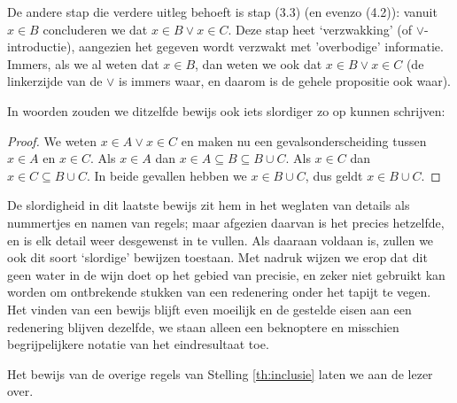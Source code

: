 De andere stap die verdere uitleg behoeft is stap (3.3) (en evenzo (4.2)): vanuit $x\in B$ concluderen we dat $x\in B\lor x\in C$. Deze stap heet `verzwakking' (of $\lor$-introductie), aangezien het gegeven wordt verzwakt met 'overbodige' informatie. Immers, als we al weten dat $x\in B$, dan weten we ook dat $x\in B\lor x\in C$ (de linkerzijde van de $\lor$ is immers waar, en daarom is de gehele propositie ook waar). %

In woorden zouden we ditzelfde bewijs ook iets slordiger zo op kunnen schrijven:
\begin{proof}
We weten $x\in A\lor x\in C$ en maken nu een gevalsonderscheiding tussen $x\in A$ en $x\in C$. Als $x\in A$ dan $x\in A\subseteq B\subseteq B\cup C$. Als $x\in C$ dan $x\in C\subseteq B\cup C$. In beide gevallen hebben we $x\in B\cup C$, dus geldt $x\in B\cup C$.
\end{proof}
De slordigheid in dit laatste bewijs zit hem in het weglaten van details als nummertjes en namen van regels; maar afgezien daarvan is het precies hetzelfde, en is elk detail weer desgewenst in te vullen. Als daaraan voldaan is, zullen we ook dit soort `slordige' bewijzen toestaan. Met nadruk wijzen we erop dat dit geen water in de wijn doet op het gebied van precisie, en zeker niet gebruikt kan worden om ontbrekende stukken van een redenering onder het tapijt te vegen. Het vinden van een bewijs blijft even moeilijk en de gestelde eisen aan een redenering blijven dezelfde, we staan alleen een beknoptere en misschien begrijpelijkere notatie van het eindresultaat toe.

Het bewijs van de overige regels van Stelling \ref{th:inclusie} laten we aan de lezer over.

